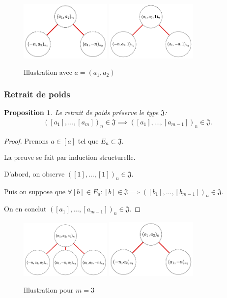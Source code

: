 \documentclass{article}
\newtheorem{proposition}{Proposition}
\newcommand{\J}{\mathfrak{J}}
\begin{document}
\begin{figure}[h]
    \caption{Illustration avec $a = (a_1, a_2)$}
    \centering
    \includegraphics[width=0.4\textwidth]{abn}
    \includegraphics[width=0.4\textwidth]{ab1n}
\end{figure}

\subsubsection{Retrait de poids}

\begin{proposition}
    Le retrait de poids préserve le type $\J$:
    \begin{align*}
        {([a_1], \dots, [a_m])}_n \in \J \implies {([a_1], \dots, [a_{m-1}])}_n \in \J.
    \end{align*}
\end{proposition}

\begin{proof}
    Prenons $a \in [a]$ tel que $E_a \subset \J$.

    La preuve se fait par induction structurelle.

    D'abord, on observe ${([1], \dots, [1])}_n \in \J$.

    Puis on suppose que $\forall [b] \in E_a : [b] \in \J \implies {([b_1], \dots, [b_{m-1}])}_n \in \J$.

    On en conclut ${([a_1], \dots, [a_{m-1}])}_n \in \J$.
\end{proof}

\begin{figure}[h]
    \caption{Illustration pour $m = 3$}
    \centering
    \includegraphics[width=0.4\textwidth]{abcn}
    \includegraphics[width=0.4\textwidth]{abn}
\end{figure}
\end{document}
